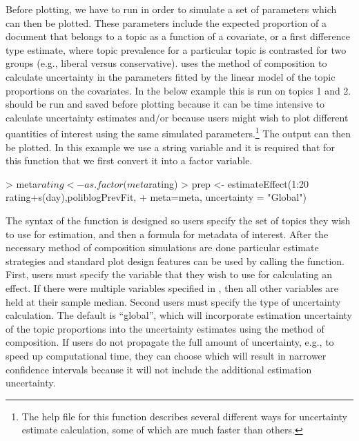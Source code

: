 \documentclass[nojss]{jss}
\begin{document}
Before plotting, we have to run  in order to simulate a set of parameters which can then be plotted. These parameters include the expected proportion of a document that belongs to a topic as a function of a covariate, or a first difference type estimate, where topic prevalence for a particular topic is contrasted for two groups (e.g., liberal versus conservative).  uses the method of composition to calculate uncertainty in the parameters fitted by the linear model of the topic proportions on the covariates.  In the below example this is run on topics 1 and 2.  should be run and saved before plotting because it can be time intensive to calculate uncertainty estimates and/or because users might wish to plot different quantities of interest using the same simulated parameters.\footnote{The help file for this function describes several different ways for uncertainty estimate calculation, some of which are much faster than others.} The output can then be plotted. In this example we use a string variable and it is required that for this function that we first convert it into a factor variable.

\begin{Schunk}
\begin{Sinput}
> meta$rating<-as.factor(meta$rating)
> prep <- estimateEffect(1:20 ~ rating+s(day),poliblogPrevFit,
+          meta=meta, uncertainty = "Global")
\end{Sinput}
\end{Schunk}

The syntax of the  function is designed so users specify the set of topics they wish to use for estimation, and then a formula for metadata of interest. After the necessary method of composition simulations are done particular estimate strategies and standard plot design features can be used by calling the  function. First, users must specify the variable that they wish to use for calculating an effect. If there were multiple variables specified in , then all other variables are held at their sample median. Second users must specify the type of uncertainty calculation. The default is ``global'', which will incorporate estimation uncertainty of the topic proportions into the uncertainty estimates using the method of composition. If users do not propagate the full amount of uncertainty, e.g., to  speed up computational time, they can choose  which will result in narrower confidence intervals because it will not include the additional estimation uncertainty.
\end{document}

